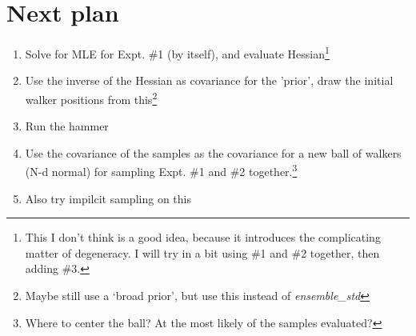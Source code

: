 \documentclass{tufte-handout}
\begin{document}
\section{Next plan}
\begin{enumerate}
    \item Solve for MLE for Expt. \#1 (by itself), and evaluate Hessian\footnote{
        This I don't think is a good idea, because it introduces the
            complicating matter of degeneracy. I will try in a bit using \#1
        and \#2 together, then adding \#3.}
\item Use the inverse of the Hessian as covariance for the 'prior',
  draw the initial walker positions from this\footnote{Maybe still use a
    `broad prior', but use this instead of \emph{ensemble\_std}}
\item Run the hammer
\item Use the covariance of the samples as the covariance for a new ball
  of walkers (N-d normal) for sampling Expt. \#1 and \#2 together.\footnote{Where
    to center the ball? At the most likely of the samples evaluated?}
\item Also try impilcit sampling on this
\end{enumerate}
\end{document}
